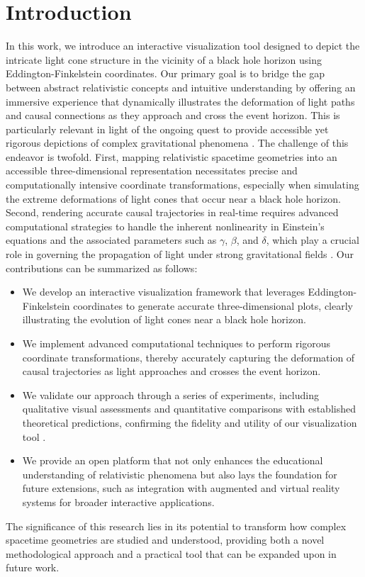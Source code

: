 \documentclass{article}
\begin{document}
\section{Introduction}  In this work, we introduce an interactive visualization tool designed to depict the intricate light cone structure in the vicinity of a black hole horizon using Eddington-Finkelstein coordinates. Our primary goal is to bridge the gap between abstract relativistic concepts and intuitive understanding by offering an immersive experience that dynamically illustrates the deformation of light paths and causal connections as they approach and cross the event horizon. This is particularly relevant in light of the ongoing quest to provide accessible yet rigorous depictions of complex gravitational phenomena \cite{Reference1,Reference2}.  The challenge of this endeavor is twofold. First, mapping relativistic spacetime geometries into an accessible three-dimensional representation necessitates precise and computationally intensive coordinate transformations, especially when simulating the extreme deformations of light cones that occur near a black hole horizon. Second, rendering accurate causal trajectories in real-time requires advanced computational strategies to handle the inherent nonlinearity in Einstein's equations and the associated parameters such as $\gamma$, $\beta$, and $\delta$, which play a crucial role in governing the propagation of light under strong gravitational fields \cite{Reference3}.  Our contributions can be summarized as follows: \begin{itemize}   \item We develop an interactive visualization framework that leverages Eddington-Finkelstein coordinates to generate accurate three-dimensional plots, clearly illustrating the evolution of light cones near a black hole horizon.   \item We implement advanced computational techniques to perform rigorous coordinate transformations, thereby accurately capturing the deformation of causal trajectories as light approaches and crosses the event horizon.   \item We validate our approach through a series of experiments, including qualitative visual assessments and quantitative comparisons with established theoretical predictions, confirming the fidelity and utility of our visualization tool \cite{Reference4}.   \item We provide an open platform that not only enhances the educational understanding of relativistic phenomena but also lays the foundation for future extensions, such as integration with augmented and virtual reality systems for broader interactive applications. \end{itemize}  The significance of this research lies in its potential to transform how complex spacetime geometries are studied and understood, providing both a novel methodological approach and a practical tool that can be expanded upon in future work.
\end{document}
